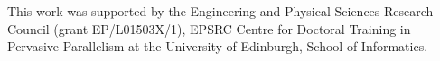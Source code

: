 This work was supported by the Engineering and Physical Sciences Research Council (grant EP/L01503X/1), EPSRC Centre for Doctoral Training in Pervasive Parallelism at the University of Edinburgh, School of Informatics.